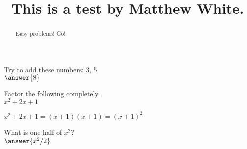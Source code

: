 \documentclass{ximera}
\title{This is a test by Matthew White.}
\begin{document}
	\begin{abstract}
		Easy problems! Go!
	\end{abstract}
	\maketitle
	
	
\begin{question}
	Try to add these numbers: 3, 5\\
	$\answer{8}$
\end{question}
	
	
	\begin{question}
	Factor the following completely.\\
	$ x^2 + 2x + 1 $ 
	\begin{hint}
		$ x^2 + 2x + 1 = (x + 1)(x + 1) = (x + 1)^2 $
		\end{hint}
		\begin{prompt}
	\begin{multipleChoice}
	\end{multipleChoice}
	\end{prompt}
	\end{question}

	\begin{question}
		What is one half of $x^2$?\\
		$	\answer{x^2/2}$
	\end{question}

	
\end{document}
